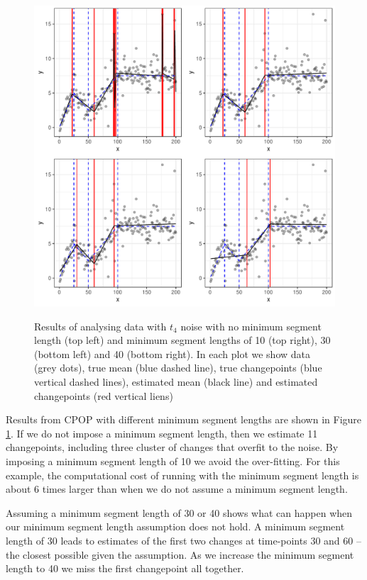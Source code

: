 \documentclass[article]{jss}
\begin{document}
\begin{figure}
\centering
{\includegraphics[scale=.5]{figures/cpop_minseg_ggplot.pdf}}
\caption{Results of analysing data with $t_4$ noise with no minimum segment length (top left) and minimum segment lengths of 10 (top right), 30 (bottom left) and 40 (bottom right). In each plot we show data (grey dots), true mean (blue dashed line), true changepoints (blue vertical dashed lines), estimated mean (black line) and estimated changepoints (red vertical liens)}
\label{fig:cpop-minseg}
\end{figure}
%
%
Results from CPOP with different minimum segment lengths are shown in Figure \ref{fig:cpop-minseg}. If we do not impose a minimum segment length, then we estimate 11 changepoints, including three cluster of changes that overfit to the noise. By imposing a minimum segment length of 10 we avoid the over-fitting. For this example, the computational cost of running  with the minimum segment length is about 6 times larger than when we do not assume a minimum segment length.

Assuming a minimum segment length of 30 or 40 shows what can happen when our minimum segment length assumption does not hold. A minimum segment length of 30 leads to estimates of the first two changes at time-points 30 and 60 -- the closest possible given the assumption. As we increase the minimum segment length to 40 we miss the first changepoint all together. 
\end{document}
